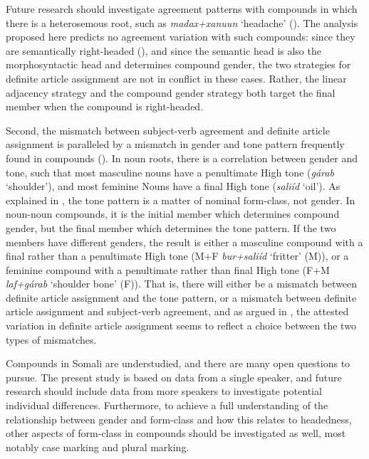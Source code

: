 \documentclass[output=paper]{langscibook}
\begin{document}
\begin{sloppypar}
Future research should investigate agreement patterns with compounds in which there is a heterosemous root, such as \textit{madax+xanuun} `headache' (). The analysis proposed here predicts no agreement variation with such compounds: since they are semantically right-headed (), and since the semantic head is also the morphosyntactic head and determines compound gender, the two strategies for definite article assignment are not in conflict in these cases. Rather, the linear adjacency strategy and the compound gender strategy both target the final member when the compound is right-headed.
\end{sloppypar}

Second, the mismatch between subject-verb agreement and definite article assignment is paralleled by a mismatch in gender and tone pattern frequently found in compounds (). In noun roots, there is a correlation between gender and tone, such that most masculine nouns have a penultimate High tone (\textit{gárab} `shoulder'), and most feminine Nouns have a final High tone (\textit{saliíd} `oil'). As explained in , the tone pattern is a matter of nominal form-class, not gender. In noun-noun compounds, it is the initial member which determines compound gender, but the final member which determines the tone pattern. If the two members have different genders, the result is either a masculine compound with a final rather than a penultimate High tone (M+F \textit{bur+saliíd} `fritter' (M)), or a feminine compound with a penultimate rather than final High tone (F+M \textit{laf+gárab} `shoulder bone' (F)). That is, there will either be a mismatch between definite article assignment and the tone pattern, or a mismatch between definite article assignment and subject-verb agreement, and as argued in , the attested variation in definite article assignment seems to reflect a choice between the two types of mismatches.

Compounds in Somali are understudied, and there are many open questions to pursue. The present study is based on data from a single speaker, and future research should include data from more speakers to investigate potential individual differences. Furthermore, to achieve a full understanding of the relationship between gender and form-class and how this relates to headedness, other aspects of form-class in compounds should be investigated as well, most notably case marking and plural marking.
\end{document}
